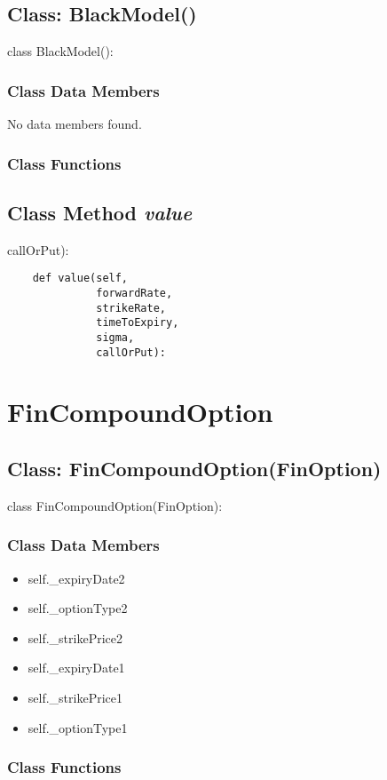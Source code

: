 \documentclass[twoside,11pt]{book}
\begin{document}
\subsection{Class: BlackModel()}
class BlackModel():

\subsubsection{Class Data Members}
No data members found.

\subsubsection{Class Functions}

\subsection{Class Method {\it value}}
callOrPut):

\begin{lstlisting}
    def value(self,
              forwardRate,
              strikeRate,
              timeToExpiry,
              sigma,
              callOrPut):
\end{lstlisting}

\newpage
\section{FinCompoundOption}

\subsection{Class: FinCompoundOption(FinOption)}
class FinCompoundOption(FinOption):

\subsubsection{Class Data Members}
\begin{itemize}
\item{self.\_expiryDate2}
\item{self.\_optionType2}
\item{self.\_strikePrice2}
\item{self.\_expiryDate1}
\item{self.\_strikePrice1}
\item{self.\_optionType1}
\end{itemize}

\subsubsection{Class Functions}
\end{document}
